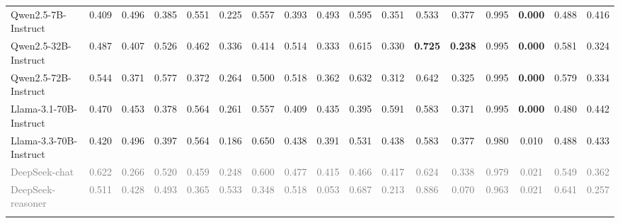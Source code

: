 \begin{table}
{\begin{tabular}{lcccccccccccccccc}
        Qwen2.5-7B-Instruct & 0.409 & 0.496 & 0.385 & 0.551 & 0.225 & 0.557 & 0.393 & 0.493 & 0.595 & 0.351 & 0.533 & 0.377 & 0.995 & \textbf{0.000} & 0.488 & 0.416 \\
    Qwen2.5-32B-Instruct & 0.487 & 0.407 & 0.526 & 0.462 & 0.336 & 0.414 & 0.514 & 0.333 & 0.615 & 0.330 & \textbf{0.725} & \textbf{0.238} & 0.995 & \textbf{0.000} & 0.581 & 0.324 \\
    Qwen2.5-72B-Instruct & 0.544 & 0.371 & 0.577 & 0.372 & 0.264 & 0.500 & 0.518 & 0.362 & 0.632 & 0.312 & 0.642 & 0.325 & 0.995 & \textbf{0.000} & 0.579 & 0.334 \\
    Llama-3.1-70B-Instruct & 0.470 & 0.453 & 0.378 & 0.564 & 0.261 & 0.557 & 0.409 & 0.435 & 0.395 & 0.591 & 0.583 & 0.371 & 0.995 & \textbf{0.000} & 0.480 & 0.442 \\
    Llama-3.3-70B-Instruct & 0.420 & 0.496 & 0.397 & 0.564 & 0.186 & 0.650 & 0.438 & 0.391 & 0.531 & 0.438 & 0.583 & 0.377 & 0.980 & 0.010 & 0.488 & 0.433 \\
    \textcolor{gray}{DeepSeek-chat} & \textcolor{gray}{0.622} & \textcolor{gray}{0.266} & \textcolor{gray}{0.520} & \textcolor{gray}{0.459} & \textcolor{gray}{0.248} & \textcolor{gray}{0.600} & \textcolor{gray}{0.477} & \textcolor{gray}{0.415} & \textcolor{gray}{0.466} & \textcolor{gray}{0.417} & \textcolor{gray}{0.624} & \textcolor{gray}{0.338} & \textcolor{gray}{0.979} & \textcolor{gray}{0.021} & \textcolor{gray}{0.549} & \textcolor{gray}{0.362} \\
    \textcolor{gray}{DeepSeek-reasoner} & \textcolor{gray}{0.511} & \textcolor{gray}{0.428} & \textcolor{gray}{0.493} & \textcolor{gray}{0.365} & \textcolor{gray}{0.533} & \textcolor{gray}{0.348} & \textcolor{gray}{0.518} & \textcolor{gray}{0.053} & \textcolor{gray}{0.687} & \textcolor{gray}{0.213} & \textcolor{gray}{0.886} & \textcolor{gray}{0.070} & \textcolor{gray}{0.963} & \textcolor{gray}{0.021} & \textcolor{gray}{0.641} & \textcolor{gray}{0.257} \\

    \rowcolor{gray!20}\multicolumn{17}{l}{\textit{\textbf{Proprietary Models}}} \\


\end{tabular}}
\end{table}
